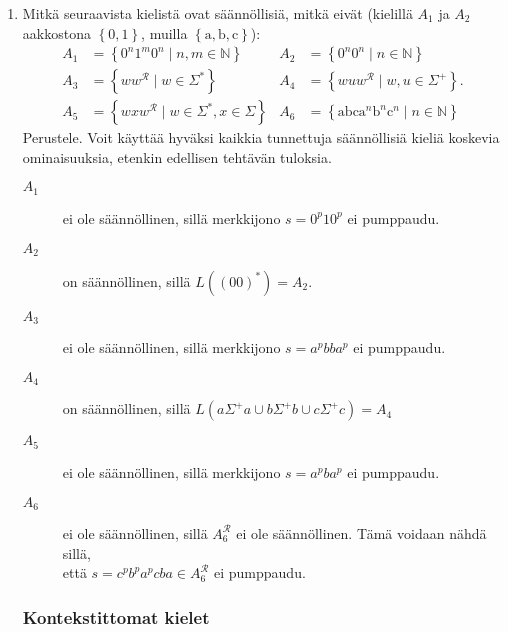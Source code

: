 \documentclass[a4paper,11pt]{article}
\newcommand{\set}[1]{{\left\{ #1 \right\}}}
\newcommand{\Nat}{\mathbb{N}}
\begin{document}
\begin{enumerate}
\item
  Mitkä seuraavista kielistä ovat säännöllisiä, mitkä
  eivät (kielillä $A_1$ ja $A_2$ aakkostona $\set{0,1}$, muilla
  $\set{\mathrm{a},\mathrm{b},\mathrm{c}}$):
  \begin{align*}
    A_1 &=\set{0^n1^m0^n\mid n,m\in \Nat}
    &A_2 &=\set{0^n0^n\mid n\in \Nat}
    \\
    A_3 &=\set{ww^\mathcal{R}\mid w\in\Sigma^{\ast}}
    &A_4 &=\set{wuw^\mathcal{R}\mid w,u\in\Sigma^+}.
    \\
    A_5 &=\set{wxw^\mathcal{R}\mid w\in\Sigma^{\ast},x\in\Sigma}
    &A_6 &=\set{\mathrm{abc}\mathrm{a}^n\mathrm{b}^n\mathrm{c}^n\mid n\in \Nat}
  \end{align*}
  Perustele. Voit käyttää hyväksi kaikkia tunnettuja säännöllisiä kieliä
  koskevia ominaisuuksia, etenkin edellisen tehtävän tuloksia.

  \begin{description}
    \item[$A_1$] ei ole säännöllinen, sillä merkkijono $s = 0^p10^p$ ei
      pumppaudu.
    \item[$A_2$] on säännöllinen, sillä $L((00)^*) = A_2$.
    \item[$A_3$] ei ole säännöllinen, sillä merkkijono $s = a^pbba^p$ ei
      pumppaudu.
    \item[$A_4$] on säännöllinen, sillä $L(a\Sigma^+a \cup b\Sigma^+b \cup c\Sigma^+c) = A_4$
    \item[$A_5$] ei ole säännöllinen, sillä merkkijono $s = a^pba^p$ ei
      pumppaudu.
    \item[$A_6$] ei ole säännöllinen, sillä $A_6^\mathcal{R}$ ei ole
      säännöllinen. Tämä voidaan nähdä sillä,\\ että \mbox{$s =
        c^pb^pa^pcba \in A_6^\mathcal{R}$} ei pumppaudu.
  \end{description}

  \subsubsection*{Kontekstittomat kielet}


\end{enumerate}
\end{document}
